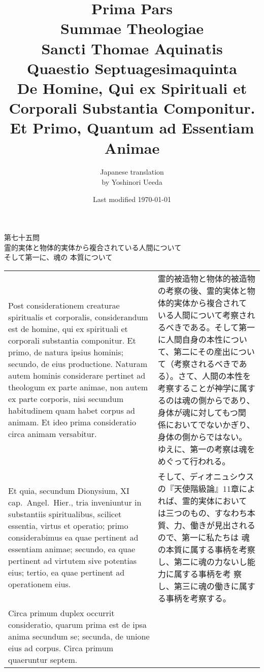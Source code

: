 \documentclass[10pt]{jsarticle} %
\title{{\bf Prima Pars}\\{\HUGE Summae Theologiae}\\Sancti Thomae
Aquinatis\\{\sffamily Quaestio Septuagesimaquinta}\\{\bf De Homine,
Qui ex Spirituali et Corporali Substantia Componitur.\\ Et Primo,
Quantum ad Essentiam Animae}}
\author{Japanese translation\\by Yoshinori {\sc Ueeda}}
\date{Last modified \today}
\begin{document}
\maketitle

\begin{center}
{\Large 第七十五問\\
霊的実体と物体的実体から複合されている人間について\\そして第一に、魂の
 本質について}
\end{center}


\begin{longtable}{p{21em}p{21em}}

Post considerationem creaturae spiritualis et corporalis,
considerandum est de homine, qui ex spirituali et corporali substantia
componitur. Et primo, de natura ipsius hominis; secundo, de eius
productione. Naturam autem hominis considerare pertinet ad theologum
ex parte animae, non autem ex parte corporis, nisi secundum
habitudinem quam habet corpus ad animam. Et ideo prima consideratio
circa animam versabitur. 

&

霊的被造物と物体的被造物の考察の後、霊的実体と物体的実体から複合されて
いる人間について考察されるべきである。そして第一に人間自身の本性につい
て、第二にその産出について（考察されるべきである）。さて、人間の本性を
考察することが神学に属するのは魂の側からであり、身体が魂に対してもつ関
係においてでないかぎり、身体の側からではない。
ゆえに、第一の考察は魂をめぐって行われる。

\\

Et quia, secundum Dionysium, XI
cap.~Angel.~Hier., tria inveniuntur in substantiis spiritualibus,
scilicet essentia, virtus et operatio; primo considerabimus ea quae
pertinent ad essentiam animae; secundo, ea quae pertinent ad virtutem
sive potentias eius; tertio, ea quae pertinent ad operationem
eius. 





& 

そして、ディオニュシウスの『天使階級論』11章によれば、霊的実体において
 は三つのもの、すなわち本質、力、働きが見出されるので、第一に私たちは
 魂の本質に属する事柄を考察し、第二に魂の力ないし能力に属する事柄を考
 察し、第三に魂の働きに属する事柄を考察する。


\\


Circa primum duplex occurrit consideratio, quarum prima est de
ipsa anima secundum se; secunda, de unione eius ad corpus. Circa
primum quaeruntur septem. 



\end{longtable}
\end{document}
